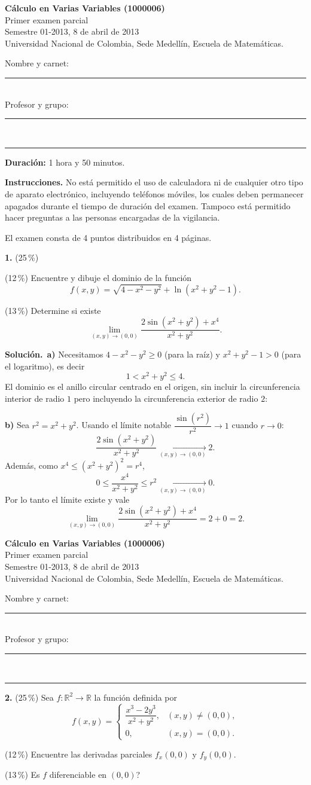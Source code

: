 \documentclass[11pt]{article}
\newcommand{\sol}{\medskip\noindent\textbf{\textcolor{solgreen}{Soluci\'on.}}\ }
\newcommand{\examheader}{%
  \noindent
  \begin{minipage}[t]{0.62\linewidth}
    {\bfseries\large C\'alculo en Varias Variables (1000006)}\\
    {\small Primer examen parcial}\\
    {\small Semestre 01-2013, 8 de abril de 2013}\\
    {\small Universidad Nacional de Colombia, Sede Medell\'in, Escuela de Matem\'aticas.}
  \end{minipage}%
  \hfill
  \begin{minipage}[t]{0.33\linewidth}
    \raggedleft\small
    Nombre y carnet: \rule{2.5cm}{0.4pt}\\[4pt]
    Profesor y grupo: \rule{2.5cm}{0.4pt}
  \end{minipage}\\[4pt]
  \rule{\linewidth}{0.6pt}
}
\begin{document}
\examheader

\textbf{Duraci\'on:} 1 hora y 50 minutos.

\textbf{Instrucciones.} No est\'a permitido el uso de calculadora ni de cualquier otro tipo de aparato electr\'onico, incluyendo tel\'efonos m\'oviles, los cuales deben permanecer apagados durante el tiempo de duraci\'on del examen. Tampoco est\'a permitido hacer preguntas a las personas encargadas de la vigilancia.

\medskip
El examen consta de 4 puntos distribuidos en 4 p\'aginas.

\bigskip
\noindent\textbf{1.} (25\,\%)
\begin{opciones}
  \item[a.] (12\,\%) Encuentre y dibuje el dominio de la funci\'on
  $$f(x,y) = \sqrt{4-x^2-y^2} + \ln(x^2+y^2-1).$$
  \item[b.] (13\,\%) Determine si existe
  $$\lim_{(x,y)\to(0,0)} \frac{2\sin(x^2+y^2)+x^4}{x^2+y^2}.$$
\end{opciones}

\sol \textbf{a)} Necesitamos $4-x^2-y^2\geq 0$ (para la ra\'iz) y $x^2+y^2-1>0$ (para el logaritmo), es decir
$$1 < x^2+y^2 \leq 4.$$
El dominio es el anillo circular centrado en el origen, sin incluir la circunferencia interior de radio $1$ pero incluyendo la circunferencia exterior de radio $2$:

\begin{center}
\end{center}

\textbf{b)} Sea $r^2=x^2+y^2$. Usando el l\'imite notable $\dfrac{\sin(r^2)}{r^2}\to 1$ cuando $r\to 0$:
$$\frac{2\sin(x^2+y^2)}{x^2+y^2} \xrightarrow[(x,y)\to(0,0)]{} 2.$$
Adem\'as, como $x^4\leq (x^2+y^2)^2=r^4$,
$$0 \leq \frac{x^4}{x^2+y^2} \leq r^2 \xrightarrow[(x,y)\to(0,0)]{} 0.$$
Por lo tanto el l\'imite existe y vale
$$\lim_{(x,y)\to(0,0)} \frac{2\sin(x^2+y^2)+x^4}{x^2+y^2} = 2+0 = 2.$$

\newpage
\examheader
\vspace{2pt}

\noindent\textbf{2.} (25\,\%) Sea $f:\mathbb{R}^2 \longrightarrow \mathbb{R}$ la funci\'on definida por
$$
f(x,y)=
\begin{cases}
\dfrac{x^3-2y^3}{x^2+y^2}, & (x,y)\neq (0,0),\\[6pt]
0, & (x,y)=(0,0).
\end{cases}
$$
\begin{opciones}
  \item[a.] (12\,\%) Encuentre las derivadas parciales $f_x(0,0)$ y $f_y(0,0)$.
  \item[b.] (13\,\%) Es $f$ diferenciable en $(0,0)$?
\end{opciones}
\end{document}
